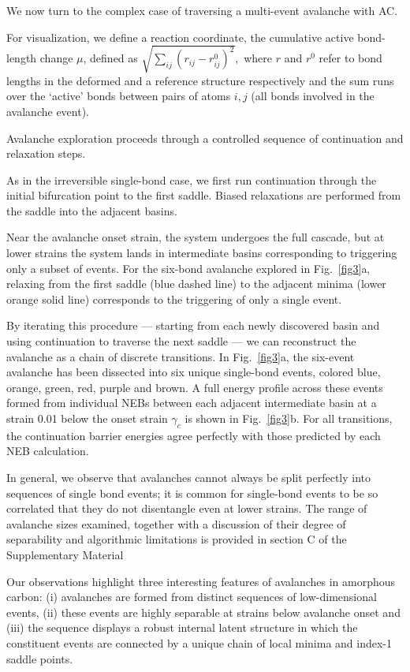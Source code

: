 \documentclass[aps,prl,reprint,superscriptaddress]{revtex4-2}
\begin{document}
We now turn to the complex case of traversing a multi-event avalanche with AC.

For visualization, we define a reaction coordinate, the cumulative active bond-length change $\mu$, defined as $\sqrt{\sum_{ij}(r_{ij}-r^{0}_{ij})^{2}},$ where $r$ and $r^0$ refer to bond lengths in the deformed and a reference structure respectively and the sum runs over the `active' bonds between pairs of atoms $i,j$ (all bonds involved in the avalanche event).

Avalanche exploration proceeds through a controlled sequence of continuation and relaxation steps.

As in the irreversible single-bond case, we first run continuation through the initial bifurcation point to the first saddle. Biased relaxations are performed from the saddle into the adjacent basins.

Near the avalanche onset strain, the system undergoes the full cascade, but at lower strains the system lands in intermediate basins corresponding to triggering only a subset of events. For the six-bond avalanche explored in Fig.~\ref{fig3}a, relaxing from the first saddle (blue dashed line) to the adjacent minima (lower orange solid line) corresponds to the triggering of only a single event.

By iterating this procedure --- starting from each newly discovered basin and using continuation to traverse the next saddle --- we can reconstruct the avalanche as a chain of discrete transitions. In Fig.~\ref{fig3}a, the six-event avalanche has been dissected into six unique single-bond events, colored blue, orange, green, red, purple and brown. A full energy profile across these events formed from individual NEBs between each adjacent intermediate basin at a strain 0.01 below the onset strain $\gamma_c$ is shown in Fig.~\ref{fig3}b. For all transitions, the continuation barrier energies agree perfectly with those predicted by each NEB calculation.

In general, we observe that avalanches cannot always be split perfectly into sequences of single bond events; it is common for single-bond events to be so correlated that they do not disentangle even at lower strains. The range of avalanche sizes examined, together with a discussion of their degree of separability and algorithmic limitations is provided in section C of the Supplementary Material \cite{SupplementalC}

Our observations highlight three interesting features of avalanches in amorphous carbon: (i) avalanches are formed from distinct sequences of low-dimensional events, (ii) these events are highly separable at strains below avalanche onset and (iii) the sequence displays a robust internal latent structure in which the constituent events are connected by a unique chain of local minima and index-1 saddle points.
\end{document}
